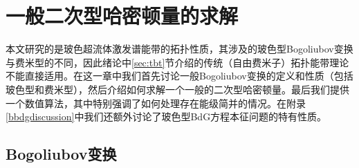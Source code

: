 
\chapter{一般二次型哈密顿量的求解}\label{ch2}
本文研究的是玻色超流体激发谱能带的拓扑性质，其涉及的玻色型Bogoliubov变换与费米型的不同，因此绪论中\ref{sec:tbt}节介绍的传统（自由费米子）拓扑能带理论不能直接适用。在这一章中我们首先讨论一般Bogoliubov变换的定义和性质（包括玻色型和费米型），然后介绍如何求解一个一般的二次型哈密顿量\cite{Blaizot1986}。最后我们提供一个数值算法，其中特别强调了如何处理存在能级简并的情况。在附录\ref{bbdgdiscussion}中我们还额外讨论了玻色型BdG方程本征问题的特有性质。

\section{Bogoliubov变换}

